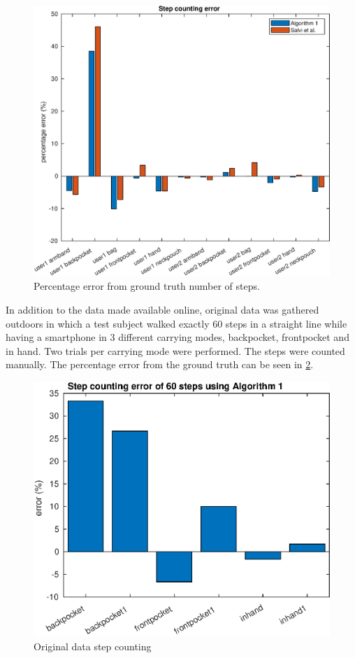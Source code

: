	\begin{figure}[H]
		\centering
		\includegraphics[width=0.7\linewidth]{images/20201112_1401_Step_counting_error}
		\caption{Percentage error from ground truth number of steps. }
		\setlength{\belowcaptionskip}{-2cm}
		\label{fig:sd_percent_comparison}
	\end{figure}
In addition to the data made available online, original data was gathered outdoors in which a test subject walked exactly 60 steps in a straight line while having a smartphone in 3 different carrying modes, backpocket, frontpocket and in hand. Two trials per carrying mode were performed. The steps were counted manually. The percentage error from the ground truth can be seen in \cref{fig:202009291013step_counting_error_of_60_steps}.
\begin{figure}[H]
	\centering
	\includegraphics[width=0.6\linewidth]{images/20201112_1406_Step_counting_error_of_60_steps_using_Algorithm_1}
	\setlength{\belowcaptionskip}{-20pt}
	\caption{Original data step counting}
	\label{fig:202009291013step_counting_error_of_60_steps}
\end{figure}

